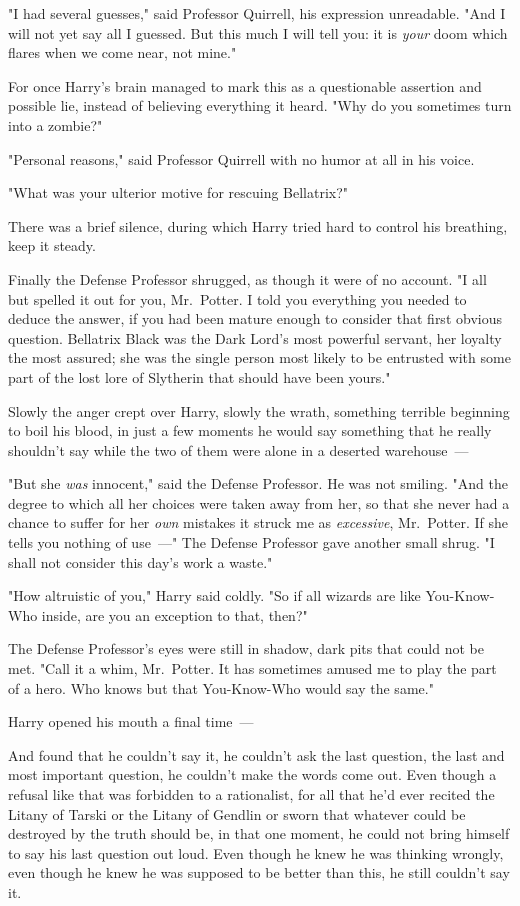 "I had several guesses," said Professor Quirrell, his expression unreadable.
"And I will not yet say all I guessed. But this much I will tell you: it is
\emph{your} doom which flares when we come near, not mine."

For once Harry's brain managed to mark this as a questionable assertion and
possible lie, instead of believing everything it heard. "Why do you sometimes
turn into a zombie?"

"Personal reasons," said Professor Quirrell with no humor at all in his voice.

"What was your ulterior motive for rescuing Bellatrix?"

There was a brief silence, during which Harry tried hard to control his
breathing, keep it steady.

Finally the Defense Professor shrugged, as though it were of no account. "I all
but spelled it out for you, Mr.~Potter. I told you everything you needed to
deduce the answer, if you had been mature enough to consider that first obvious
question. Bellatrix Black was the Dark Lord's most powerful servant, her
loyalty the most assured; she was the single person most likely to be entrusted
with some part of the lost lore of Slytherin that should have been yours."

Slowly the anger crept over Harry, slowly the wrath, something terrible
beginning to boil his blood, in just a few moments he would say something that
he really shouldn't say while the two of them were alone in a deserted
warehouse~---

"But she \emph{was} innocent," said the Defense Professor. He was not smiling.
"And the degree to which all her choices were taken away from her, so that she
never had a chance to suffer for her \emph{own} mistakes{\el} it struck me
as \emph{excessive}, Mr.~Potter. If she tells you nothing of use~---" The
Defense Professor gave another small shrug. "I shall not consider this day's
work a waste."

"How altruistic of you," Harry said coldly. "So if all wizards are like
You-Know-Who inside, are you an exception to that, then?"

The Defense Professor's eyes were still in shadow, dark pits that could not be
met. "Call it a whim, Mr.~Potter. It has sometimes amused me to play the part
of a hero. Who knows but that You-Know-Who would say the same."

Harry opened his mouth a final time~---

And found that he couldn't say it, he couldn't ask the last question, the last
and most important question, he couldn't make the words come out. Even though a
refusal like that was forbidden to a rationalist, for all that he'd ever
recited the Litany of Tarski or the Litany of Gendlin or sworn that whatever
could be destroyed by the truth should be, in that one moment, he could not
bring himself to say his last question out loud. Even though he knew he was
thinking wrongly, even though he knew he was supposed to be better than this,
he still couldn't say it.

